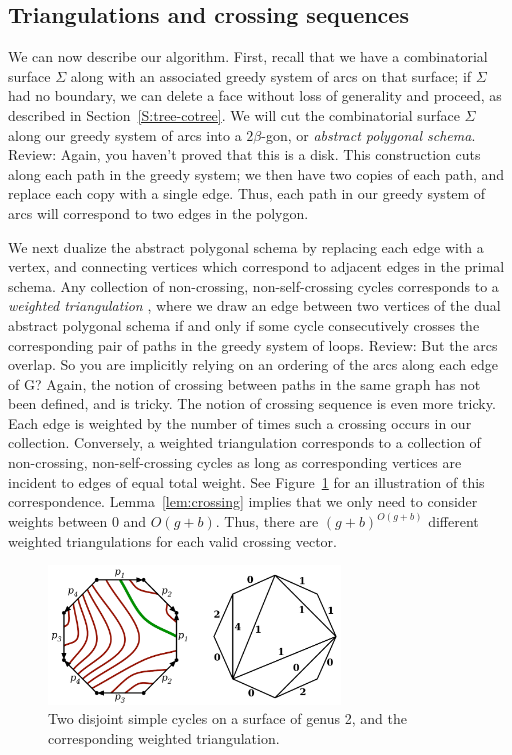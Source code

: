 \documentclass[letterpaper,review]{siamart190516}
\def\rnote#1{\color{red}Review: #1 \color{black}}
\begin{document}
\subsection{Triangulations and crossing sequences}
\label{SS:homotopy-triangulation}


We can now describe our algorithm.  First, recall that we have a combinatorial surface $\Sigma$ along with an associated greedy system of arcs on that surface; if  $\Sigma$ had no boundary, we can delete a face without loss of generality and proceed, as described in Section~\ref{S:tree-cotree}.
We will cut the combinatorial surface $\Sigma$ along our greedy system of arcs into a $2\beta$-gon, or \emph{abstract polygonal schema}.  
\rnote{Again, you haven't proved that this is a disk. }
This construction cuts along each path in the greedy system; we then have two copies of each path,  and replace each copy  with a single edge.  Thus, each path in our greedy system of arcs will correspond to two edges in the polygon.

We next dualize the abstract polygonal schema by replacing each edge with a vertex, and connecting vertices which correspond to adjacent edges in the primal schema.  Any collection of non-crossing, non-self-crossing cycles corresponds to a \emph{weighted triangulation} \cite{ccelw-scsih-08}, where we draw an edge between two vertices of the dual abstract polygonal schema if and only if some cycle consecutively crosses the corresponding pair of paths in the greedy system of loops.  
\rnote{
But the arcs overlap. So you are implicitly relying on an ordering of the arcs along each edge of G? Again, the notion of crossing between paths in the same graph has not been defined, and is tricky. The notion of crossing sequence is even more tricky.
}
Each edge is weighted by the number of times such a crossing occurs in our collection.  Conversely, a weighted triangulation corresponds to a collection of non-crossing, non-self-crossing cycles as long as corresponding vertices are incident to edges of equal total weight.  See Figure~\ref{fig:weightedtriangulation} for an illustration of this correspondence.  Lemma~\ref{lem:crossing} implies that we only need to consider weights between 0 and $O(g+b)$.  Thus, there are $(g+b)^{O(g+b)}$ different weighted triangulations for each valid crossing vector.


\begin{figure}[htb]
\centering\includegraphics[height=1.45in]{Fig/triangulation}
\caption{Two disjoint simple cycles on a surface of genus 2, and the corresponding weighted triangulation.}
\label{fig:weightedtriangulation}
\end{figure}
\end{document}
